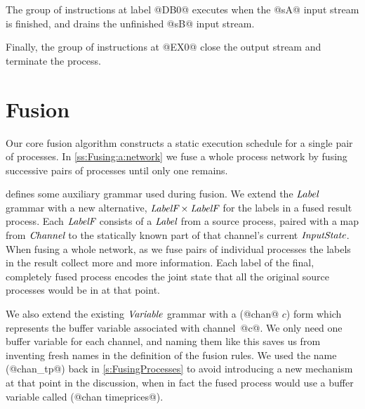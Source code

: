 
The group of instructions at label @DB0@ executes when the @sA@ input stream is finished, and drains the unfinished @sB@ input stream.

Finally, the group of instructions at @EX0@ close the output stream and terminate the process.



\section{Fusion}
\label{s:Fusion}

Our core fusion algorithm constructs a static execution schedule for a single pair of processes.
In \cref{ss:Fusing:a:network} we fuse a whole process network by fusing successive pairs of processes until only one remains.

 defines some auxiliary grammar used during fusion. We extend the $\textit{Label}$ grammar with a new alternative, $\textit{LabelF} \times \textit{LabelF}$ for the labels in a fused result process. Each $\textit{LabelF}$ consists of a $\textit{Label}$ from a source process, paired with a map from $\textit{Channel}$ to the statically known part of that channel's current $\textit{InputState}$. When fusing a whole network, as we fuse pairs of individual processes the labels in the result collect more and more information. Each label of the final, completely fused process encodes the joint state that all the original source processes would be in at that point.



We also extend the existing $\textit{Variable}$ grammar with a (@chan@ $c$) form which represents the buffer variable associated with \mbox{channel @c@}. We only need one buffer variable for each channel, and naming them like this saves us from inventing fresh names in the definition of the fusion rules.
We used the name (@chan_tp@) back in \cref{s:FusingProcesses} to avoid introducing a new mechanism at that point in the discussion, when in fact the fused process would use a buffer variable called (@chan timeprices@).

